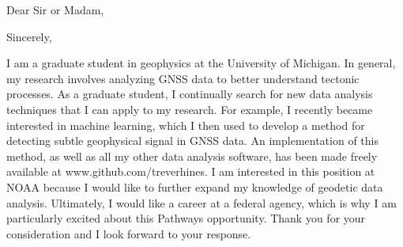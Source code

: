 \documentclass[11pt,a4paper,sans]{moderncv}
\begin{document}
\date{June 27, 2017}
\opening{Dear Sir or Madam,}
\closing{Sincerely,}
\makelettertitle

I am a graduate student in geophysics at the University of Michigan. In general, my research involves analyzing GNSS data to better understand tectonic processes. As a graduate student, I continually search for new data analysis techniques that I can apply to my research. For example, I recently became interested in machine learning, which I then used to develop a method for detecting subtle geophysical signal in GNSS data. An implementation of this method, as well as all my other data analysis software, has been made freely available at www.github.com/treverhines. I am interested in this position at NOAA because I would like to further expand my knowledge of geodetic data analysis. Ultimately, I would like a career at a federal agency, which is why I am particularly excited about this Pathways opportunity. Thank you for your consideration and I look forward to your response.

\makeletterclosing
\end{document}
